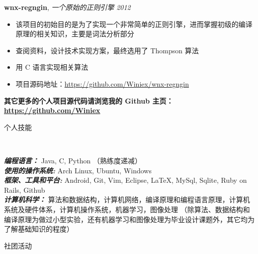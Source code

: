 \documentclass[9pt]{ctexart}
\newenvironment{changemargin}[2]{%
    \begin{list}{}{%
            \setlength{\topsep}{0pt}%
            \setlength{\leftmargin}{#1}%
            \setlength{\rightmargin}{#2}%
            \setlength{\listparindent}{\parindent}%
        \setlength{\itemindent}{\parindent}%
            \setlength{\parsep}{\parskip}%
        }%
  \item[]}{\end{list}
      }
\newcommand{\lineover}{
          \begin{changemargin}{-0.05in}{-0.05in}
              \vspace*{-8pt}
              \hrulefill \\
              \vspace*{-2pt}
          \end{changemargin}
      }
\newcommand{\header}[1]{
          \begin{changemargin}{-0.5in}{-0.5in}
              \scshape{#1}\\
              \lineover
          \end{changemargin}
      }
\newenvironment{body} {
          \vspace*{-16pt}
          \begin{changemargin}{-0.25in}{-0.5in}
          }	
      {\end{changemargin}
      }
\begin{document}
      \begin{body}
          \vspace{14pt}

          \vspace*{-4pt}
          \textbf {wnx-regngin}, \emph{一个原始的正则引擎} \hfill \emph{2012}\\
      \begin{itemize} \itemsep -0pt
              \item 该项目的初始目的是为了实现一个非常简单的正则引擎，进而掌握初级的编译原理的相关知识，主要是词法分析部分
              \item 查阅资料，设计技术实现方案，最终选用了 Thompson 算法
              \item 用 C 语言实现相关算法
              \item 项目源码地址：\url{https://github.com/Winiex/wnx-regngin}
          \end{itemize}

          \vspace*{-4pt}
          \textbf {其它更多的个人项目源代码请浏览我的 Github 主页：\url{https://github.com/Winiex}}
      \end{body}

      \smallskip

      \header{个人技能}

      \begin{body}
          \vspace{14pt}
          \emph{\textbf{编程语言：}}{} Java, C, Python （熟练度递减）\\
          \medskip
          \emph{\textbf{使用的操作系统:}}{} Arch Linux, Ubuntu, Windows \\
          \medskip
          \emph{\textbf{框架、工具和平台:}}{} Android, Git, Vim, Eclipse, \LaTeX, MySql, Sqlite, Ruby on Rails, Github \\
          \medskip
          \emph{\textbf{计算机科学：}}{} 算法和数据结构，计算机网络，编译原理和编程语言原理，计算机系统及硬件体系，计算机操作系统，机器学习，图像处理 （除算法、数据结构和编译原理为做过小型实验，还有机器学习和图像处理为毕业设计课题外，其它均为了解基础知识的程度）

      \end{body}

      \smallskip


      \header{社团活动}
\end{document}
